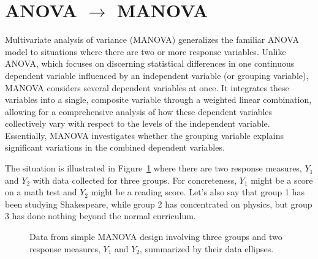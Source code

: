 \documentclass[
  letterpaper,
  10pt,
  krantz2]{krantz}
\begin{document}
{\section{\texorpdfstring{ANOVA \(\rightarrow\)
MANOVA}{ANOVA \textbackslash rightarrow MANOVA}}\label{anova-rightarrow-manova}

Multivariate analysis of variance (MANOVA) generalizes the familiar
ANOVA model to situations where there are two or more response
variables. Unlike ANOVA, which focuses on discerning statistical
differences in one continuous dependent variable influenced by an
independent variable (or grouping variable), MANOVA considers several
dependent variables at once. It integrates these variables into a
single, composite variable through a weighted linear combination,
allowing for a comprehensive analysis of how these dependent variables
collectively vary with respect to the levels of the independent
variable. Essentially, MANOVA investigates whether the grouping variable
explains significant variations in the combined dependent variables.

The situation is illustrated in Figure~\ref{fig-manova-diagram} where
there are two response measures, \(Y_1\) and \(Y_2\) with data collected
for three groups. For concreteness, \(Y_1\) might be a score on a math
test and \(Y_2\) might be a reading score. Let's also say that group 1
has been studying Shakespeare, while group 2 has concentrated on
physics, but group 3 has done nothing beyond the normal curriculum.

\begin{figure}


\caption{\label{fig-manova-diagram}Data from simple MANOVA design
involving three groups and two response measures, \(Y_1\) and \(Y_2\),
summarized by their data ellipses.}


\end{figure}}
\end{document}
